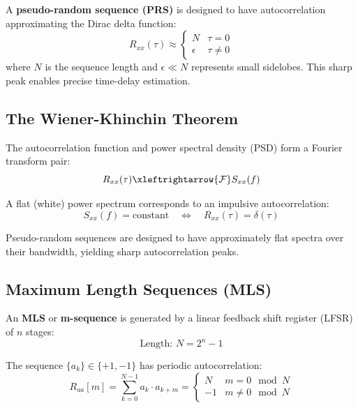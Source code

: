 \documentclass[11pt]{article}
\begin{document}
A \textbf{pseudo-random sequence (PRS)} is designed to have autocorrelation approximating the Dirac delta function:
\begin{equation}
R_{xx}(\tau) \approx \begin{cases}
N & \tau = 0 \\
\epsilon & \tau \neq 0
\end{cases}
\end{equation}
where $N$ is the sequence length and $\epsilon \ll N$ represents small sidelobes. This sharp peak enables precise time-delay estimation.

\subsection{The Wiener-Khinchin Theorem}

The autocorrelation function and power spectral density (PSD) form a Fourier transform pair:
\begin{equation}
R_{xx}(\tau) \xleftrightarrow{\mathcal{F}} S_{xx}(f)
\end{equation}

A flat (white) power spectrum corresponds to an impulsive autocorrelation:
\begin{equation}
S_{xx}(f) = \text{constant} \quad \Longleftrightarrow \quad R_{xx}(\tau) = \delta(\tau)
\end{equation}

Pseudo-random sequences are designed to have approximately flat spectra over their bandwidth, yielding sharp autocorrelation peaks.

\subsection{Maximum Length Sequences (MLS)}

An \textbf{MLS} or \textbf{m-sequence} is generated by a linear feedback shift register (LFSR) of $n$ stages:
\begin{equation}
\text{Length: } N = 2^n - 1
\end{equation}

The sequence $\{a_k\} \in \{+1, -1\}$ has periodic autocorrelation:
\begin{equation}
R_{aa}[m] = \sum_{k=0}^{N-1} a_k \cdot a_{k+m} = \begin{cases}
N & m = 0 \mod N \\
-1 & m \neq 0 \mod N
\end{cases}
\end{equation}
\end{document}
